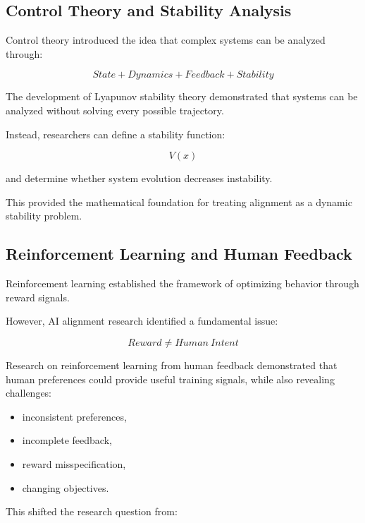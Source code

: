 \documentclass[11pt]{article}
\begin{document}
\subsection{Control Theory and Stability Analysis}


Control theory introduced the idea that complex systems can be analyzed
through:


\[
State
+
Dynamics
+
Feedback
+
Stability
\]


The development of Lyapunov stability theory demonstrated that systems
can be analyzed without solving every possible trajectory.


Instead, researchers can define a stability function:


\[
V(x)
\]


and determine whether system evolution decreases instability.


This provided the mathematical foundation for treating alignment as a
dynamic stability problem.



\subsection{Reinforcement Learning and Human Feedback}


Reinforcement learning established the framework of optimizing behavior
through reward signals.


However, AI alignment research identified a fundamental issue:


\[
Reward
\neq
Human\ Intent
\]


Research on reinforcement learning from human feedback demonstrated that
human preferences could provide useful training signals, while also
revealing challenges:


\begin{itemize}

\item inconsistent preferences,

\item incomplete feedback,

\item reward misspecification,

\item changing objectives.

\end{itemize}



This shifted the research question from:
\end{document}
